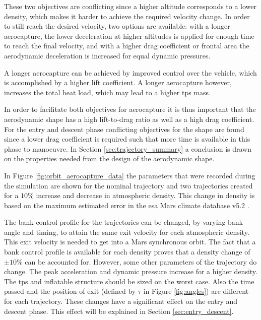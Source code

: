 These two objectives are conflicting since a higher altitude corresponds to a lower density, which makes it harder to achieve the required velocity change. In order to still reach the desired velocity, two options are available: with a longer aerocapture, the lower deceleration at higher altitudes is applied for enough time to reach the final velocity, and with a higher drag coefficient or frontal area the aerodynamic deceleration is increased for equal dynamic pressures.

A longer aerocapture can be achieved by improved control over the vehicle, which is accomplished by a higher lift coefficient. A longer aerocapture however, increases the total heat load, which may lead to a higher \gls{tps} mass.

In order to facilitate both objectives for aerocapture it is thus important that the aerodynamic shape has a high lift-to-drag ratio as well as a high drag coefficient. For the entry and descent phase conflicting objectives for the shape are found since a lower drag coefficient is required such that more time is available in this phase to manoeuvre. In Section \ref{sec:trajectory_summary} a conclusion is drawn on the properties needed from the design of the aerodynamic shape.

In Figure \ref{fig:orbit_aerocapture_data} the parameters that were recorded during the simulation are shown for the nominal trajectory and two trajectories created for a $10\%$ increase and decrease in atmospheric density. This change in density is based on the maximum estimated error in the \gls{esa} Mars climate database v5.2 \cite{Lewis2015}.

The bank control profile for the trajectories can be changed, by varying bank angle and timing, to attain the same exit velocity for each atmospheric density. This exit velocity is needed to get into a Mars synchronous orbit. The fact that a bank control profile is available for each density proves that a density change of $\pm 10\%$ can be accounted for. However, some other parameters of the trajectory do change. The peak acceleration and dynamic pressure increase for a higher density. The \gls{tps} and inflatable structure should be sized on the worst case. Also the time passed and the position of exit (defined by $\tau$ in Figure \ref{fig:angles}) are different for each trajectory. These changes have a significant effect on the entry and descent phase. This effect will be explained in Section \ref{sec:entry_descent}.

